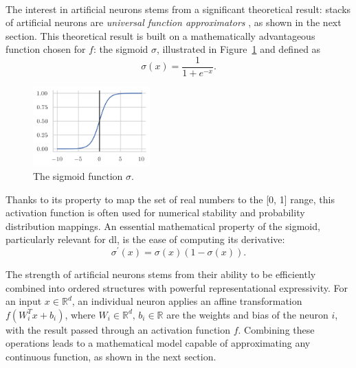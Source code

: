 \paragraph{} The interest in artificial neurons stems from a significant theoretical result: stacks of artificial neurons are \textit{universal function approximators} \cite{universalFuncApproxNN,HORNIK1989359}, as shown in the next section. This theoretical result is built on a mathematically advantageous function chosen for $f$: the sigmoid $\sigma$, illustrated in Figure~\ref{fig:sigmoid} and defined as
\begin{equation}\label{eq:sigmoid}
    \sigma(x) = \frac{1}{1 + e^{-x}}.
\end{equation}
\begin{figure}
    \begin{center}
        \includegraphics[width=0.4\textwidth]{Images/ML/sigmoid.png}
        \caption{The sigmoid function $\sigma$.} 
        \label{fig:sigmoid}
    \end{center}
\end{figure}

Thanks to its property to map the set of real numbers to the [0, 1] range, this activation function is often used for numerical stability and probability distribution mappings. An essential mathematical property of the sigmoid, particularly relevant for \gls{dl}, is the ease of computing its derivative: \[\sigma^\prime(x) = \sigma(x) (1- \sigma(x)).\]

The strength of artificial neurons stems from their ability to be efficiently combined into ordered structures with powerful representational expressivity. For an input $x \in \mathbb{R}^d$, an individual neuron applies an affine transformation $f(W_i^T x + b_i)$, where $W_i \in \mathbb{R}^d,\,b_i \in \mathbb{R}$ are the weights and bias of the neuron $i$, with the result passed through an activation function $f$. Combining these operations leads to a mathematical model capable of approximating any continuous function, as shown in the next section. 

